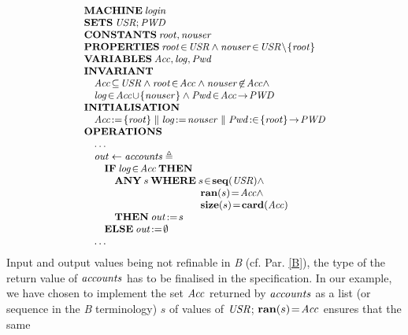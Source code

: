 \documentclass[conference]{IEEEtran}
\begin{document}
\[\small\begin{array}{l}
\Cmd{MACHINE}\:\fid{login}\\
\Cmd{SETS}\:\fid{USR};\fid{PWD}\\
\Cmd{CONSTANTS}\:\fid{root},\fid{nouser}\\
\Cmd{PROPERTIES}\:\fid{root}\!\in\!\fid{USR}\land
                  \fid{nouser}\!\in\!\fid{USR}\!\setminus\!\{\fid{root}\}\\
\Cmd{VARIABLES}\:\fid{Acc},\fid{log},\fid{Pwd}\\
\Cmd{INVARIANT}\\
\quad \fid{Acc}\!\subseteq\!\fid{USR}\land\fid{root}\!\in\!\fid{Acc}\land
      \fid{nouser}\!\not\in\!\fid{Acc}\land\\
\quad \fid{log}\!\in\!\fid{Acc}\!\cup\!\{\fid{nouser}\}\land
      \fid{Pwd}\!\in\!\fid{Acc}\!\to\!\fid{PWD}\\
\Cmd{INITIALISATION}\\
\quad\fid{Acc}\!:=\!\{\fid{root}\}\parallel\fid{log}\!:=\!\fid{nouser}\parallel
     \fid{Pwd}\!:\in\!\{\fid{root}\}\!\to\!\fid{PWD}\\
\Cmd{OPERATIONS}\\
\quad\ldots\\
\quad \fid{out}\gets\fid{accounts}\triangleq\\
\quad\quad\Cmd{IF}\:\fid{log}\!\in\!\fid{Acc}\:\Cmd{THEN}\\
\quad\quad\quad\Cmd{ANY}\:s\:\Cmd{WHERE}\:s\!\in\!\Cmd{seq}(\fid{USR})\land\\
\quad\quad\quad\quad\quad\quad\quad\quad\quad\quad\quad\:\:
                                          \Cmd{ran}(s)\!=\!\fid{Acc}\land\\
\quad\quad\quad\quad\quad\quad\quad\quad\quad\quad\quad\:\:
\Cmd{size}(s)\!=\!\Cmd{card}(\fid{Acc})\\
\quad\quad\quad\Cmd{THEN}\:\fid{out}\!:=\!s\\
\quad\quad\Cmd{ELSE}\:\fid{out}\!:=\!\emptyset\\
\quad\ldots\\
\end{array}\]
Input and output values being not refinable in \emph{B} (cf. Par. \ref{B}), the type of the
return value of {\small$\textrm{\emph{accounts}}$} has to be finalised in the specification. In our
example, we have chosen to implement the set {\small$\textrm{\emph{Acc}}$} returned by
{\small$\textrm{\emph{accounts}}$} as a list (or sequence in the \emph{B} terminology) {\small$s$} of
values of {\small$\textrm{\emph{USR}}$}; {\small$\mathbf{ran}(s)\!=\!\textrm{\emph{Acc}}$} ensures that the same
\end{document}

